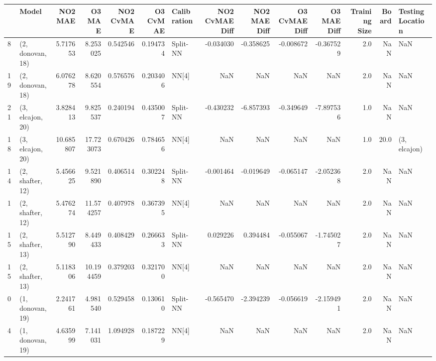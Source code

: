 \begin{tabular}{llrrrrlrrrrrrl}
\toprule
{} &             Model &    NO2 MAE &     O3 MAE &  NO2 CvMAE &  O3 CvMAE & Calibration &  NO2 CvMAE Diff &  NO2 MAE Diff &  O3 CvMAE Diff &  O3 MAE Diff &  Training Size &  Board & Testing Location \\
\midrule
8  &  (2, donovan, 18) &   5.717653 &   8.253025 &   0.542546 &  0.194734 &    Split-NN &       -0.034030 &     -0.358625 &      -0.008672 &    -0.367529 &            2.0 &    NaN &              NaN \\
19 &  (2, donovan, 18) &   6.076278 &   8.620554 &   0.576576 &  0.203406 &       NN[4] &             NaN &           NaN &            NaN &          NaN &            2.0 &    NaN &              NaN \\
21 &  (3, elcajon, 20) &   3.828413 &   9.825537 &   0.240194 &  0.435007 &    Split-NN &       -0.430232 &     -6.857393 &      -0.349649 &    -7.897536 &            1.0 &    NaN &              NaN \\
18 &  (3, elcajon, 20) &  10.685807 &  17.723073 &   0.670426 &  0.784656 &       NN[4] &             NaN &           NaN &            NaN &          NaN &            1.0 &   20.0 &     (3, elcajon) \\
14 &  (2, shafter, 12) &   5.456625 &   9.521890 &   0.406514 &  0.302248 &    Split-NN &       -0.001464 &     -0.019649 &      -0.065147 &    -2.052368 &            2.0 &    NaN &              NaN \\
1  &  (2, shafter, 12) &   5.476274 &  11.574257 &   0.407978 &  0.367395 &       NN[4] &             NaN &           NaN &            NaN &          NaN &            2.0 &    NaN &              NaN \\
15 &  (2, shafter, 13) &   5.512790 &   8.449433 &   0.408429 &  0.266633 &    Split-NN &        0.029226 &      0.394484 &      -0.055067 &    -1.745027 &            2.0 &    NaN &              NaN \\
15 &  (2, shafter, 13) &   5.118306 &  10.194459 &   0.379203 &  0.321700 &       NN[4] &             NaN &           NaN &            NaN &          NaN &            2.0 &    NaN &              NaN \\
0  &  (1, donovan, 19) &   2.241761 &   4.981540 &   0.529458 &  0.130610 &    Split-NN &       -0.565470 &     -2.394239 &      -0.056619 &    -2.159491 &            2.0 &    NaN &              NaN \\
4  &  (1, donovan, 19) &   4.635999 &   7.141031 &   1.094928 &  0.187229 &       NN[4] &             NaN &           NaN &            NaN &          NaN &            2.0 &    NaN &              NaN \\

\end{tabular}
